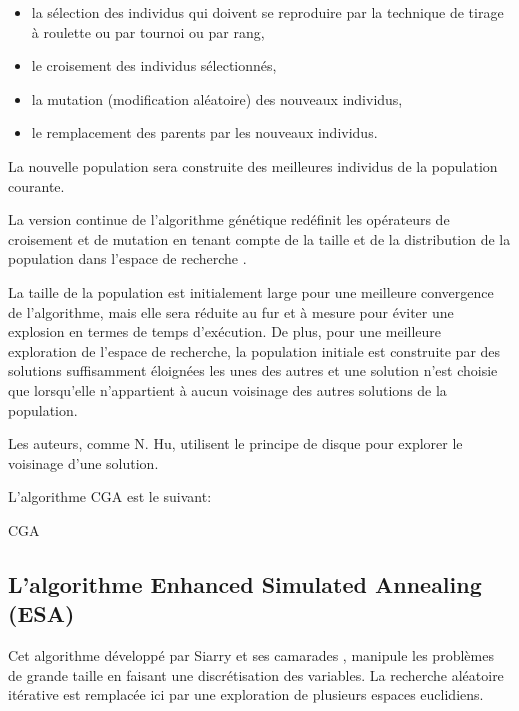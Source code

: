 \begin{itemize}
	\item la sélection des individus qui doivent se reproduire par la technique de tirage à roulette ou par tournoi ou par rang,
	\item le croisement des individus sélectionnés,
	\item la mutation (modification aléatoire) des nouveaux individus,
	\item le remplacement des parents par les nouveaux individus.
\end{itemize}

La nouvelle population sera construite des meilleures individus de la population courante.
 
La version continue de l'algorithme génétique redéfinit les opérateurs de croisement et de mutation en tenant compte de la taille et de la distribution de la population dans l'espace de recherche \cite{Chelouadh_siarry_2000}.

La taille de la population est initialement large pour une meilleure convergence de l'algorithme, mais elle sera réduite au fur et à mesure pour éviter une explosion en termes de temps d'exécution. De plus, pour une meilleure exploration de l'espace de recherche, la population initiale est construite par des solutions suffisamment éloignées les unes des autres et une solution n'est choisie que lorsqu'elle n'appartient à aucun voisinage des autres solutions de la population.

Les auteurs, comme N. Hu\cite{Hu_1992}, utilisent le principe de disque pour explorer le voisinage d'une solution.

L'algorithme CGA est le suivant:\\

\begin{algorithm}[H]
	\caption{CGA}
\end{algorithm}

\subsection{L'algorithme Enhanced Simulated Annealing (ESA)}
Cet algorithme développé par Siarry et ses camarades \cite{siarry1997enhanced}, manipule les problèmes de grande taille en faisant une discrétisation des variables. La recherche aléatoire itérative est remplacée ici par une exploration de plusieurs espaces euclidiens.

